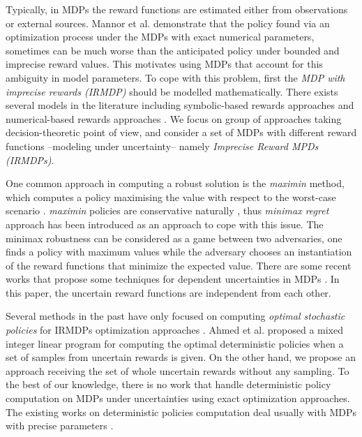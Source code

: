 
Typically, in MDPs the reward functions are estimated either from observations or external sources. Mannor et al. \cite{Mannor2007} demonstrate that the policy found via an optimization process under the MDPs with exact numerical parameters, sometimes can be much worse than the anticipated policy under bounded and imprecise reward values. This motivates using MDPs that account for this ambiguity in model parameters. To cope with this problem, first the \textit{MDP with imprecise rewards (IRMDP)} should be modelled mathematically. There exists several models in the literature including symbolic-based rewards approaches \cite{Furnkranz2012,Weng2012} and numerical-based rewards approaches \cite{bell1982,Regan2009,Xu2009}. We focus on group of approaches taking decision-theoretic point of view, and consider a set of MDPs with different reward functions --modeling under uncertainty-- namely \textit{Imprecise Reward MPDs (IRMDPs)}. 

One common approach in computing a robust solution is the \textit{maximin} method, which computes a policy maximising the value with respect to the worst-case scenario \cite{GIVAN2000,Iyengar2005,mastin2012,Nilim2005}. \textit{maximin} policies are conservative naturally \cite{Delage2007}, thus \textit{minimax regret} approach \cite{Regan2009,Xu2009} has been introduced as an approach to cope with this issue. The minimax robustness can be considered as a game between two adversaries, one finds a policy with maximum values while the adversary chooses an instantiation of the reward functions that minimize the expected value. There are some recent works that propose some techniques for dependent uncertainties in MDPs \cite{Mannor2012,Wiesemann2013}. In this paper, the uncertain reward functions are independent from each other. 

Several methods in the past have only focused on computing  \textit{optimal stochastic policies} for IRMDPs optimization approaches \cite{Regan2009,Regan2010,Xu2009}. %
Ahmed et al. \cite{Ahmed2017} proposed a mixed integer linear program for computing the optimal deterministic policies when a set of samples from uncertain rewards is given.  On the other hand, we propose an approach receiving the set of whole uncertain rewards without any sampling. To the best of our knowledge, there is no work that handle deterministic policy computation on MDPs under uncertainties using exact optimization approaches. The existing works on deterministic policies computation deal usually with MDPs with precise parameters \cite{Dolgov2005,Montufar2015}. %